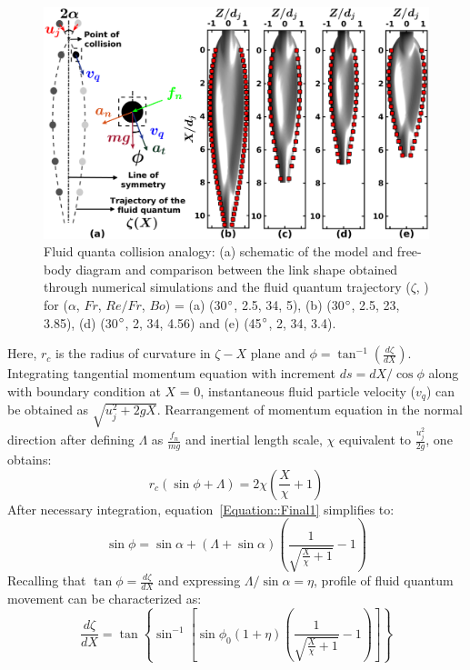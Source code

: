 \documentclass[%
 aip,
 sd,%
amsmath,amssymb,
preprint,%
author-year,%
]{revtex4-1}
\begin{document}
\begin{figure}
	\centering
	\includegraphics[width=\linewidth]{Figure10}
	\caption{Fluid quanta collision analogy: (a) schematic of the model and free-body diagram and comparison between the link shape obtained through numerical simulations and the fluid quantum trajectory ($\zeta$, \protect\MarkerSquareRed) for ($\alpha$, $Fr$, $Re/Fr$, $Bo$) = (a) (30$\degree$, 2.5, 34, 5), (b) (30$\degree$, 2.5, 23, 3.85), (d) (30$\degree$, 2, 34, 4.56) and (e) (45$\degree$, 2, 34, 3.4).}
	\label{Figure::analytical}
\end{figure}%
Here, $r_c$ is the radius of curvature in $\zeta-X$ plane and $\phi = \tan^{-1}\left(\frac{d\zeta}{dX}\right)$. Integrating tangential momentum equation with increment $ds = dX/\cos\phi$ along with boundary condition at $X$ = 0, instantaneous fluid particle velocity ($v_{q}$) can be obtained as $\sqrt{u_j^2 + 2gX}$. Rearrangement of momentum equation in the normal direction after defining $\Lambda$ as $\frac{f_n}{mg}$ and inertial length scale, $\chi$ equivalent to $\frac{u_j^2}{2g}$, one obtains:
\begin{equation}\label{Equation::Final1}
r_c\left(\sin\phi + \Lambda\right) = 2\chi\left(\frac{X}{\chi} + 1\right)
\end{equation} 
After necessary integration, equation~\ref{Equation::Final1} simplifies to:
\begin{equation}
\sin\phi  = \sin\alpha + \left(\Lambda + \sin\alpha\right)\left(\frac{1}{\sqrt{\frac{X}{\chi} + 1}} - 1\right)	
\end{equation}
Recalling that $\tan\phi = \frac{d\zeta}{dX}$ and expressing $\Lambda/\sin\alpha = \eta$, profile of fluid quantum movement can be characterized as:
\begin{equation}
\label{Equation::AnaFinal}
\frac{d\zeta}{dX} = \tan\left\lbrace\sin^{-1}\left[ \sin\phi_0\left(1 + \eta\right)\left(\frac{1}{\sqrt{\frac{X}{\chi} + 1}} - 1\right) \right]\right\rbrace
\end{equation}
\end{document}
